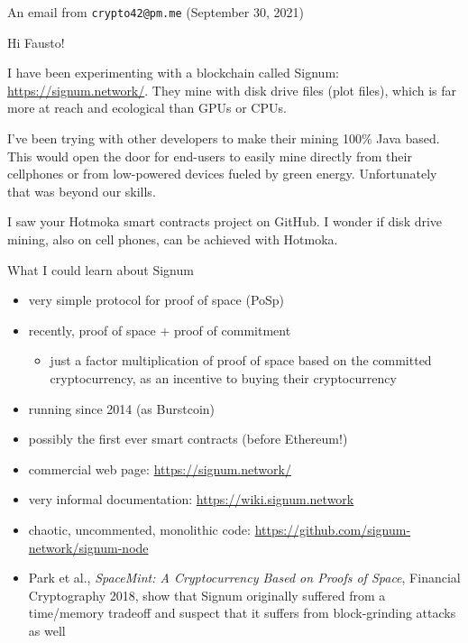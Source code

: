 \documentclass[11pt]{beamer}  %
\begin{document}
\begin{frame}{An email from \texttt{crypto42@pm.me} (September 30, 2021)}

  \begin{greenbox}{}
    Hi Fausto!

    \vspace{2ex}

    I have been experimenting with a blockchain called \alert{Signum: \url{https://signum.network/}}.
    They \alert{mine with
    disk drive files (plot files)}, which is far more at reach
    and \alert{ecological} than GPUs or CPUs.

    \vspace{1ex}

    I've been trying with other developers to make their mining 100\%
    Java based. This would open the door for end-users to easily \alert{mine directly
    from their cellphones} or from low-powered devices fueled by \alert{green energy}.
    Unfortunately that was beyond our skills.

    \vspace{1ex}

    I saw your Hotmoka smart contracts project on GitHub.
    I wonder if disk drive mining, also on cell phones, can be achieved with Hotmoka.
  \end{greenbox}

\end{frame}

\begin{frame}{What I could learn about Signum}

  \begin{itemize}
  \item very simple protocol for proof of space (PoSp)
  \item recently, proof of space + proof of commitment
    \begin{itemize}
    \item[] just a factor multiplication of proof of space
      based on the committed cryptocurrency, as an incentive
      to buying their cryptocurrency
    \end{itemize}
  \item running since 2014 (as Burstcoin)
  \item possibly the first ever smart contracts (before Ethereum!)
  \item commercial web page: \url{https://signum.network/}
  \item very informal documentation:
    \url{https://wiki.signum.network}
  \item chaotic, uncommented, monolithic code:
    \url{https://github.com/signum-network/signum-node}
  \item Park et al., \emph{SpaceMint: A Cryptocurrency Based on Proofs of Space},
    Financial Cryptography 2018,
    show that Signum originally suffered from a time/memory tradeoff
    and suspect that it suffers from block-grinding attacks as well
  \end{itemize}

\end{frame}
\end{document}
